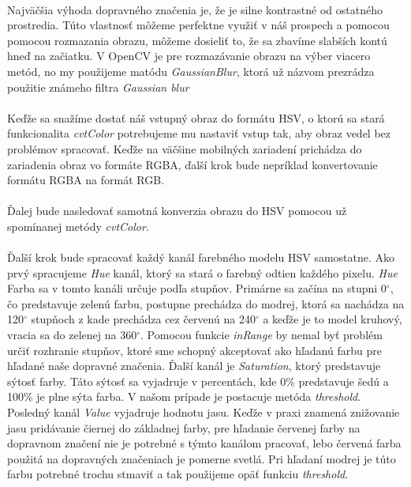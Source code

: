 \documentclass[12pt]{article}
\begin{document}
\paragraph{}
Najväčšia výhoda dopravného značenia je, že je silne kontrastné od ostatného prostredia.
Túto vlastnosť môžeme perfektne využiť v náš prospech a pomocou pomocou rozmazania obrazu, môžeme dosieliť to,
že sa zbavíme slabších kontú hneď na začiatku. V OpenCV je pre rozmazávanie obrazu na výber viacero metód,
no my použijeme matódu \emph{GaussianBlur}, ktorá už názvom prezrádza použitie známeho filtra \emph{Gaussian blur}
\paragraph{}
Keďže sa snažíme dostať náš vstupný obraz do formátu HSV, o ktorú sa stará funkcionalita \emph{cvtColor} 
potrebujeme mu nastaviť vstup tak, aby obraz vedel bez problémov spracovať. 
Keďže na väčšine mobilných zariadení prichádza do zariadenia obraz vo formáte RGBA, ďalší krok bude nepríklad konvertovanie formátu RGBA na formát RGB.
\paragraph{}
Ďalej bude nasledovať samotná konverzia obrazu do HSV pomocou už spomínanej metódy \emph{cvtColor}.
\paragraph{}
Ďalší krok bude spracovať každý kanál farebného modelu HSV samostatne. Ako prvý spracujeme \emph{Hue} kanál, ktorý sa stará o farebný odtien každého pixelu.
\emph{Hue} Farba sa v tomto kanáli určuje podľa stupňov. 
Primárne sa začína na stupni 0$^\circ$, čo predstavuje zelenú farbu, postupne prechádza do modrej,
ktorá sa nachádza na 120$^\circ$ stupňoch z kade prechádza cez červenú na 240$^\circ$ a keďže je to model kruhový, vracia sa do zelenej na 360$^\circ$.
Pomocou funkcie \emph{inRange} by nemal byť problém určiť rozhranie stupňov, ktoré sme schopný akceptovať ako hľadanú farbu pre hľadané naše dopravné značenia.
Ďalší kanál je \emph{Saturation}, ktorý predstavuje sýtosť farby. Táto sýtosť sa vyjadruje v percentách, kde 0\% predstavuje šedú a 100\% je plne sýta farba.\cite{hsv_wiki_cz} 
V našom prípade je postacuje metóda \emph{threshold}. Posledný kanál \emph{Value} vyjadruje hodnotu jasu.
Keďže v praxi znamená znižovanie jasu pridávanie čiernej do základnej farby,
pre hľadanie červenej farby na dopravnom značení nie je potrebné s týmto kanálom pracovať, lebo červená farba použitá na dopravných značeniach je pomerne svetlá.
Pri hľadaní modrej je túto farbu potrebné trochu stmaviť a tak použijeme opäť funkciu \emph{threshold}.
\end{document}

